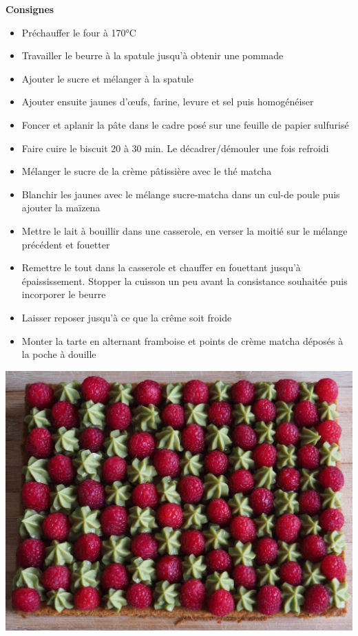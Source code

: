 \documentclass[]{book}
\providecommand{\tightlist}{%
  \setlength{\itemsep}{0pt}\setlength{\parskip}{0pt}}
\begin{document}
\textbf{Consignes}

\begin{itemize}
\tightlist
\item
  Préchauffer le four à 170°C
\item
  Travailler le beurre à la spatule jusqu'à obtenir une pommade
\item
  Ajouter le sucre et mélanger à la spatule
\item
  Ajouter ensuite jaunes d'œufs, farine, levure et sel puis homogénéiser
\item
  Foncer et aplanir la pâte dans le cadre posé sur une feuille de papier
  sulfurisé
\item
  Faire cuire le biscuit 20 à 30 min. Le décadrer/démouler une fois
  refroidi
\item
  Mélanger le sucre de la crème pâtissière avec le thé matcha
\item
  Blanchir les jaunes avec le mélange sucre-matcha dans un cul-de poule
  puis ajouter la maïzena
\item
  Mettre le lait à bouillir dans une casserole, en verser la moitié sur
  le mélange précédent et fouetter
\item
  Remettre le tout dans la casserole et chauffer en fouettant jusqu'à
  épaississement. Stopper la cuisson un peu avant la consistance
  souhaitée puis incorporer le beurre
\item
  Laisser reposer jusqu'à ce que la crême soit froide
\item
  Monter la tarte en alternant framboise et points de crème matcha
  déposés à la poche à douille
\end{itemize}

\begin{center}\includegraphics[width=0.9\linewidth]{photos/framb_matcha1} \end{center}
\end{document}
